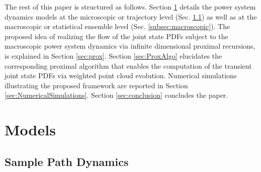 \documentclass[10pt,twocolumn]{IEEEtran}
\begin{document}
The rest of this paper is structured as follows. Section \ref{sec:models} details the power system dynamics models at the microscopic or trajectory level (Sec. \ref{subsec:samplepathdynamics}) as well as at the macroscopic or statistical ensemble level (Sec. \ref{subsec:macroscopic}). The proposed idea of realizing the flow of the joint state PDFs subject to the macroscopic power system dynamics via infinite dimensional proximal recursions, is explained in Section \ref{sec:prox}. Section \ref{sec:ProxAlgo} elucidates the corresponding proximal algorithm that enables the computation of the transient joint state PDFs via weighted point cloud evolution. Numerical simulations illustrating the proposed framework are reported in Section \ref{sec:NumericalSimulations}. Section \ref{sec:conclusion} concludes the paper.


\section{Models}\label{sec:models}

\subsection{Sample Path Dynamics}\label{subsec:samplepathdynamics}
\end{document}
